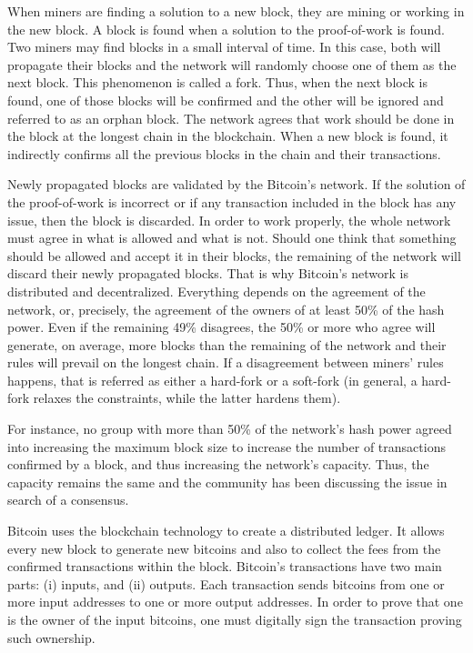 When miners are finding a solution to a new block, they are mining or working in the new block. A block is found when a solution to the proof-of-work is found. Two miners may find blocks in a small interval of time. In this case, both will propagate their blocks and the network will randomly choose one of them as the next block. This phenomenon is called a fork. Thus, when the next block is found, one of those blocks will be confirmed and the other will be ignored and referred to as an orphan block. The network agrees that work should be done in the block at the longest chain in the blockchain. When a new block is found, it indirectly confirms all the previous blocks in the chain and their transactions.

Newly propagated blocks are validated by the Bitcoin's network. If the solution of the proof-of-work is incorrect or if any transaction included in the block has any issue, then the block is discarded. In order to work properly, the whole network must agree in what is allowed and what is not. Should one think that something should be allowed and accept it in their blocks, the remaining of the network will discard their newly propagated blocks. That is why Bitcoin's network is distributed and decentralized. Everything depends on the agreement of the network, or, precisely, the agreement of the owners of at least 50\% of the hash power. Even if the remaining 49\% disagrees, the 50\% or more who agree will generate, on average, more blocks than the remaining of the network and their rules will prevail on the longest chain. If a disagreement between miners' rules happens, that is referred as either a hard-fork or a soft-fork (in general, a hard-fork relaxes the constraints, while the latter hardens them).

For instance, no group with more than 50\% of the network's hash power agreed into increasing the maximum block size to increase the number of transactions confirmed by a block, and thus increasing the network's capacity. Thus, the capacity remains the same and the community has been discussing the issue in search of a consensus.

Bitcoin uses the blockchain technology to create a distributed ledger. It allows every new block to generate new bitcoins and also to collect the fees from the confirmed transactions within the block. Bitcoin's transactions have two main parts: (i) inputs, and (ii) outputs. Each transaction sends bitcoins from one or more input addresses to one or more output addresses. In order to prove that one is the owner of the input bitcoins, one must digitally sign the transaction proving such ownership.

